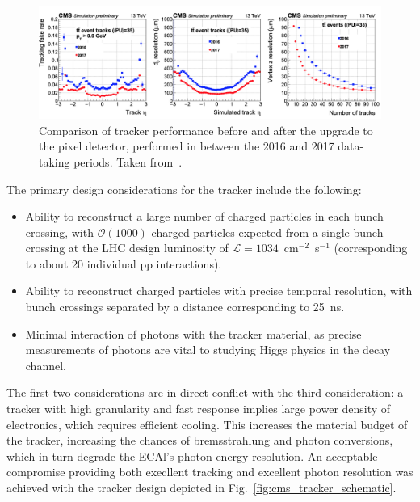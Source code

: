 \begin{figure} [htbp!]
    \centering
    \includegraphics[width=\linewidth]{figures/cms/cms_pixel_upgrade.png}
    \caption{Comparison of tracker performance before and after the upgrade to the pixel detector, performed in between the 2016 and 2017 data-taking periods. Taken from~\cite{Botta:2285433}.}
    \label{fig:cms_tracker_upgrade}
\end{figure}

The primary design considerations for the tracker include the following:
\begin{itemize}
    \item Ability to reconstruct a large number of charged particles in each bunch crossing, with $\mathcal O(1000)$ charged particles expected from a single bunch crossing at the LHC design luminosity of $\mathcal L = 1034$~cm$^{-2}$~s$^{-1}$ (corresponding to about 20 individual pp interactions).
    \item Ability to reconstruct charged particles with precise temporal resolution, with bunch crossings separated by a distance corresponding to 25~ns.
    \item Minimal interaction of photons with the tracker material, as precise measurements of photons are vital to studying Higgs physics in the \Hgg decay channel.
\end{itemize}

The first two considerations are in direct conflict with the third consideration: a tracker with high granularity and fast response implies large power density of electronics, which requires efficient cooling. This increases the material budget of the tracker, increasing the chances of bremsstrahlung and photon conversions, which in turn degrade the ECAl's photon energy resolution. 
An acceptable compromise providing both execllent tracking and excellent photon resolution was achieved with the tracker design depicted in Fig.~\ref{fig:cms_tracker_schematic}.

